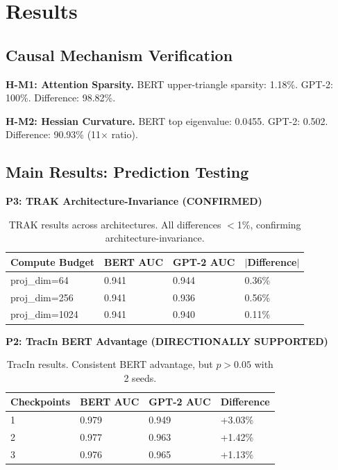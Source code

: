 \section{Results}

\subsection{Causal Mechanism Verification}

\textbf{H-M1: Attention Sparsity.} BERT upper-triangle sparsity: 1.18\%. GPT-2: 100\%. Difference: 98.82\%. \checkmark

\textbf{H-M2: Hessian Curvature.} BERT top eigenvalue: 0.0455. GPT-2: 0.502. Difference: 90.93\% (11$\times$ ratio). \checkmark

\subsection{Main Results: Prediction Testing}

\textbf{P3: TRAK Architecture-Invariance (CONFIRMED)}

\begin{table}[h]
\centering
\begin{tabular}{llll}
\toprule
Compute Budget & BERT AUC & GPT-2 AUC & $|$Difference$|$ \\
\midrule
proj\_dim=64 & 0.941 & 0.944 & 0.36\% \\
proj\_dim=256 & 0.941 & 0.936 & 0.56\% \\
proj\_dim=1024 & 0.941 & 0.940 & 0.11\% \\
\bottomrule
\end{tabular}
\caption{TRAK results across architectures. All differences $<$1\%, confirming architecture-invariance.}
\label{tab:trak}
\end{table}

\textbf{P2: TracIn BERT Advantage (DIRECTIONALLY SUPPORTED)}

\begin{table}[h]
\centering
\begin{tabular}{llll}
\toprule
Checkpoints & BERT AUC & GPT-2 AUC & Difference \\
\midrule
1 & 0.979 & 0.949 & +3.03\% \\
2 & 0.977 & 0.963 & +1.42\% \\
3 & 0.976 & 0.965 & +1.13\% \\
\bottomrule
\end{tabular}
\caption{TracIn results. Consistent BERT advantage, but $p>0.05$ with 2 seeds.}
\label{tab:tracin}
\end{table}

